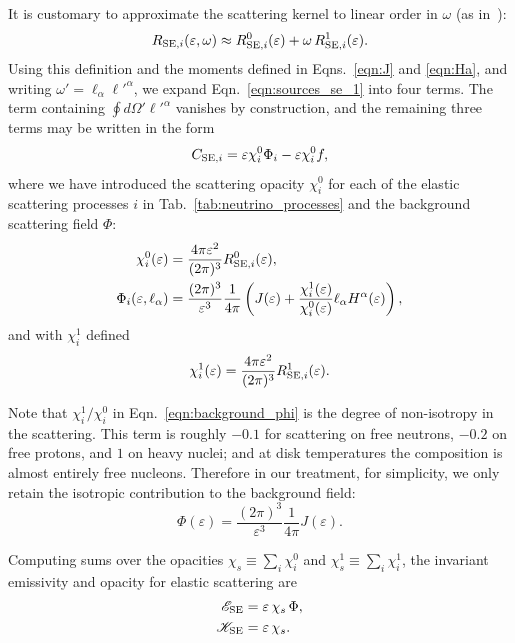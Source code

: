 \documentclass[aps,floatfix,prd,superscriptaddress,twocolumn]{revtex4-1}
\begin{document}
It is customary to approximate the scattering kernel to linear order in
$\omega$ (as in~\cite[Eqn.~4.21]{shib2011-truncated_moment}):
\begin{equation}
  \label{eqn:se_kernel_expansion}
  R_{{\rm SE},i}(\varepsilon,\omega) \approx
  R_{{\rm SE},i}^0(\varepsilon) + \omega \, R_{{\rm SE},i}^1(\varepsilon).
\end{equation}
Using this definition and the moments defined in Eqns.~\ref{eqn:J}
and \ref{eqn:Ha}, and writing $\omega'=\ell_\alpha\ell'^\alpha$,
we expand Eqn.~\ref{eqn:sources_se_1} into four terms.
The term containing $\oint d\Omega' \ell'^\alpha$ vanishes by construction,
and the remaining three terms may be written in the form
\begin{equation}
  \label{eqn:sources_se_2}
  C_{{\rm SE},i}
  = \varepsilon \chi^0_i \Phi_i - \varepsilon \chi^0_i f,
\end{equation}
where we have introduced the scattering opacity $\chi^0_i$
for each of the elastic scattering processes $i$ in
Tab.~\ref{tab:neutrino_processes} and the background scattering field $\Phi$:
\begin{align}
  \label{eqn:opacity_s}
  \chi^0_i(\varepsilon)
  &= \frac{4\pi\varepsilon^2}{(2\pi)^3}R_{{\rm SE},i}^0(\varepsilon), \\
  \label{eqn:background_phi}
  \Phi_i(\varepsilon,\ell_\alpha)
  &= \frac{(2\pi)^3}{\varepsilon^3}\frac{1}{4\pi}
  \left(J(\varepsilon)+
  \frac{\chi^1_i(\varepsilon)}{\chi^0_i(\varepsilon)}
  \ell_\alpha H^\alpha(\varepsilon)\right),
\end{align}
and with $\chi^1_i$ defined
\begin{equation}
  \label{eqn:opacity_s_tr}
  \chi^1_i(\varepsilon)
  = \frac{4\pi\varepsilon^2}{(2\pi)^3}R_{{\rm SE},i}^1(\varepsilon).
\end{equation}

Note that $\chi^1_i/\chi^0_i$ in Eqn.~\ref{eqn:background_phi}
is the degree of non-isotropy in the scattering.
This term is roughly $-0.1$ for scattering on free neutrons,
$-0.2$ on free protons, and $1$ on heavy nuclei;
and at disk temperatures the composition is almost entirely free nucleons.
Therefore in our treatment, for simplicity,
we only retain the isotropic contribution to the background field:
\begin{equation}
  \Phi(\varepsilon)
  = \frac{(2\pi)^3}{\varepsilon^3}\frac{1}{4\pi}
  J(\varepsilon).
\end{equation}

Computing sums over the opacities
$\chi_s\equiv\sum_i\chi^0_i$ and
$\chi^1_s\equiv\sum_i\chi^1_i$,
the invariant emissivity and opacity for elastic scattering are
\begin{align}
  \label{eqn:se_emissivity_summed}
  \mathscr{E}_{\rm SE}
  &= \varepsilon \, \chi_s \, \Phi, \\
  \label{eqn:se_opacity_summed}
  \mathscr{K}_{\rm SE}
  &= \varepsilon \, \chi_s.
\end{align}
\end{document}
